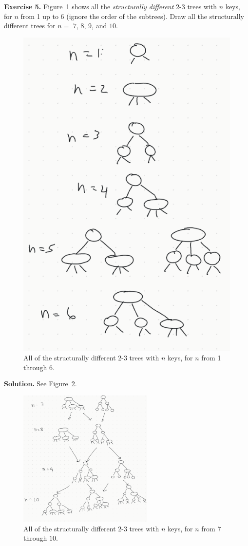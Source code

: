 \documentclass[12pt, a4paper]{article}
\newenvironment{ex}[2][Exercise]
{\par\medskip\noindent \textbf{#1 #2.}}
{\medskip}
\newenvironment{sol}[1][Solution]
{\par\medskip\noindent \textbf{#1.} }
{\medskip}
\begin{document}
	\begin{ex}{5}
		Figure~\ref{fig:ex-05-1} shows all the \emph{structurally different} 2-3 trees with $n$
		keys, for $n$ from 1 up to 6 (ignore the order of the subtrees). Draw all the structurally
		different trees for $n=$ $7$, $8$, $9$, and $10$.
		\begin{figure}
			\centering
			\includegraphics[width=0.4 \textwidth]{exercise-05-1}
			\caption{All of the structurally different 2-3 trees with $n$ keys, for
			$n$ from 1 through $6$.}
			\label{fig:ex-05-1}
		\end{figure}
	\end{ex}
	\begin{sol}
		See Figure~\ref{fig:ex-05-2}.
		\begin{figure}
			\centering
			\includegraphics[width=0.6\textwidth]{exercise-05-2}
			\caption{All of the structurally different 2-3 trees with $n$ keys, for
				$n$ from $7$ through $10$.}
			\label{fig:ex-05-2}
		\end{figure}
	\end{sol}
\end{document}
